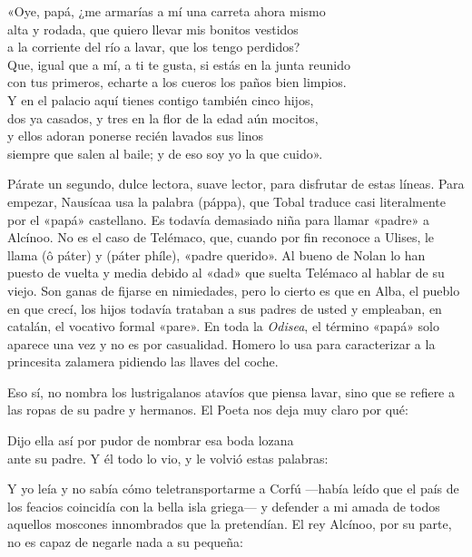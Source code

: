 \begin{versocita}
«Oye, papá, ¿me armarías a mí una carreta ahora mismo\\
alta y rodada, que quiero llevar mis bonitos vestidos\\
a la corriente del río a lavar, que los tengo perdidos?\\
Que, igual que a mí, a ti te gusta, si estás en la junta reunido\\
con tus primeros, echarte a los cueros los paños bien limpios.\\
Y en el palacio aquí tienes contigo también cinco hijos,\\
dos ya casados, y tres en la flor de la edad aún mocitos,\\
y ellos adoran ponerse recién lavados sus linos\\
siempre que salen al baile; y de eso soy yo la que cuido».
\end{versocita}

Párate un segundo, dulce lectora, suave lector, para disfrutar de estas líneas. Para empezar, Nausícaa usa la palabra  (páppa), que Tobal traduce casi literalmente por el «papá» castellano. Es todavía demasiado niña para llamar «padre» a Alcínoo. No es el caso de Telémaco, que, cuando por fin reconoce a Ulises, le llama  (ô páter) y  (páter phíle), «padre querido». Al bueno de Nolan lo han puesto de vuelta y media debido al «dad» que suelta Telémaco al hablar de su viejo. Son ganas de fijarse en nimiedades, pero lo cierto es que en Alba, el pueblo en que crecí, los hijos todavía trataban a sus padres de usted y empleaban, en catalán, el vocativo formal «pare». En toda la \emph{Odisea}, el término «papá» solo aparece una vez y no es por casualidad. Homero lo usa para caracterizar a la princesita zalamera pidiendo las llaves del coche.

Eso sí, no nombra los lustrigalanos atavíos que piensa lavar, sino que se refiere a las ropas de su padre y hermanos. El Poeta nos deja muy claro por qué:

\begin{versocita}
Dijo ella así por pudor de nombrar esa boda lozana\\
ante su padre. Y él todo lo vio, y le volvió estas palabras:
\end{versocita}

Y yo leía y no sabía cómo teletransportarme a Corfú ---había leído que el país de los feacios coincidía con la bella isla griega--- y defender a mi amada de todos aquellos moscones innombrados que la pretendían. El rey Alcínoo, por su parte, no es capaz de negarle nada a su pequeña:

